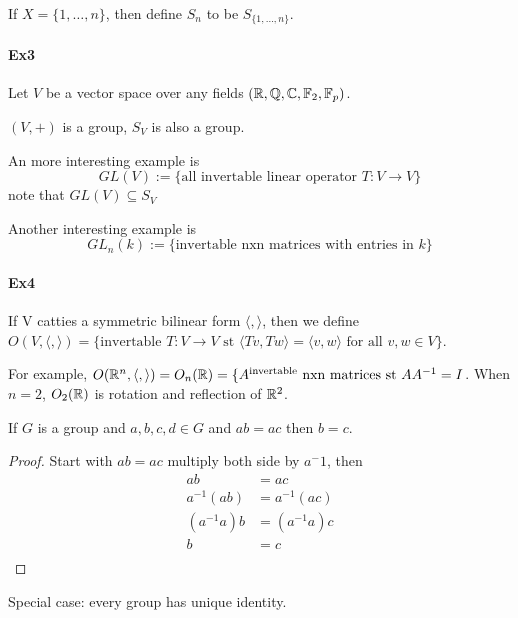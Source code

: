 If $X=\{1, \ldots, n\}$, then define $S_n$ to be $S_{\{1, \ldots, n\}}$.

\paragraph{Ex3}
Let $V$ be a vector space over any fields $({\mathbb R}, {\mathbb Q}, {\mathbb C}, {\mathbb F}_2, {\mathbb F}_p)$.

$(V, +)$ is a group, $S_V$ is also a group.

An more interesting example is
\[GL(V) := \{\textrm{all invertable linear operator } T:V\to V\}\]
note that $GL(V) \subseteq S_V$

Another interesting example is
\[GL_n(k) := \{\textrm{invertable nxn matrices with entries in }k\}\]

\paragraph{Ex4}
If V catties a symmetric bilinear form $\langle,\rangle$,
then we define $O(V, \langle,\rangle) = \{\textrm{invertable }T:V\to V\textrm{ st }\langle Tv,Tw\rangle = \langle v,w\rangle\textrm{ for all } v,w\in V\}$.

For example, $O({\mathbb R}^n, \langle,\rangle) = O_n({\mathbb R}) = \{A^\mathrm{invertable} \textrm{ nxn matrices st } AA^{-1} = I$. When $n=2$, $O_2({\mathbb R})$ is rotation and reflection of ${\mathbb R}^2$.

\begin{prop}
If $G$ is a group and $a, b, c, d \in G$ and $ab=ac$ then $b=c$.
\end{prop}
\begin{proof}
Start with $ab=ac$ multiply both side by $a^-1$,
then
\begin{align*}
ab &= ac \\
a^{-1}(ab) &= a^{-1}(ac) \\
(a^{-1}a)b &= (a^{-1}a)c \\
b &= c \\
\end{align*}
\end{proof}
\begin{remark}
Special case: every group has unique identity.
\end{remark}



